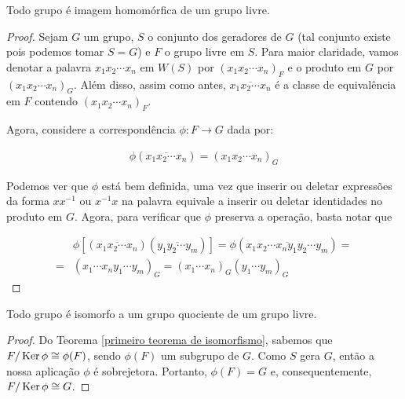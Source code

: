 	\begin{theorem}
		\label{mapeamento universal}
		Todo grupo é imagem homomórfica de um grupo livre.
	\end{theorem}
	
	\begin{proof}
		Sejam $G$ um grupo, $S$ o conjunto dos geradores de $G$ (tal conjunto existe pois podemos tomar $S = G$) e $F$ o grupo livre em $S$. Para maior claridade, vamos denotar a palavra $x_1x_2\cdots x_n$ em $W(S)$ por $(x_1x_2\cdots x_n)_F$ e o produto em $G$ por $(x_1x_2\cdots x_n)_G$. Além disso, assim como antes, $\overline{x_1x_2\cdots x_n}$ é a classe de equivalência em $F$ contendo $(x_1x_2\cdots x_n)_F$.
		
		\par\vspace{0.3cm} Agora, considere a correspondência $\phi: F\to G$ dada por: 
		
		\begin{align*}
		\phi(\overline{x_1x_2\cdots x_n}) = (x_1x_2\cdots x_n)_G
		\end{align*}
		
		\par\vspace{0.3cm} 
		Podemos ver que $\phi$ está bem definida, uma vez que inserir ou deletar expressões da forma $xx^{-1}$ ou $x^{-1}x$ na palavra equivale a inserir ou deletar identidades no produto em $G$. Agora, para verificar que $\phi$ preserva a operação, basta notar que
		
		\begin{align*}
		&\phi[(\overline{x_1x_2\cdots x_n})(\overline{y_1y_2\cdots y_m})] =  \phi(\overline{x_1x_2\cdots x_ny_1y_2\cdots y_m}) = \\ = &(x_1\cdots x_ny_1\cdots y_m)_G = (x_1\cdots x_n)_G(y_1\cdots y_m)_G
		\end{align*}
		
	\end{proof}
	
	\begin{corollary}
		\label{iso grupo quociente}
		Todo grupo é isomorfo a um grupo quociente de um grupo livre.
	\end{corollary}
	
	\begin{proof}
		Do Teorema \eqref{primeiro teorema de isomorfismo}, sabemos que $F/\operatorname{Ker}\phi\cong \phi(F)$, sendo $\phi(F)$ um subgrupo de $G$. Como $S$ gera $G$, então a nossa aplicação $\phi$ é sobrejetora. Portanto, $\phi(F) = G$ e, consequentemente, $F/\operatorname{Ker}\phi\cong G$.
	\end{proof}
	
